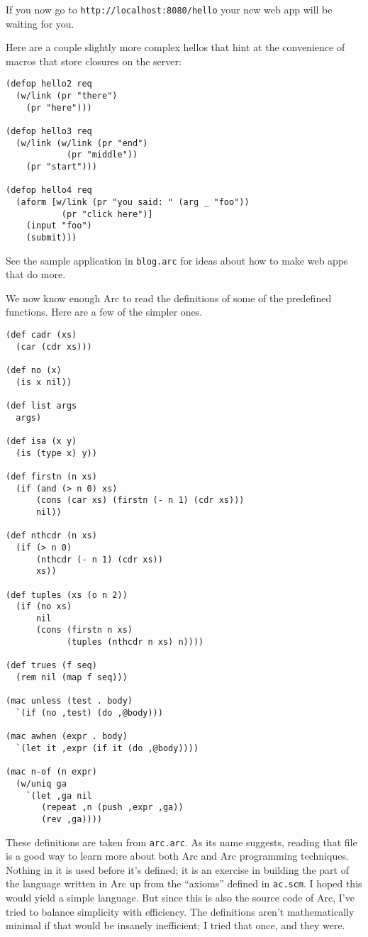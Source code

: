 \documentclass[a4paper,12pt]{book}
\begin{document}
If you now go to \verb|http://localhost:8080/hello| your new web app will
be waiting for you.

Here are a couple slightly more complex hellos that hint at the
convenience of macros that store closures on the server:

\begin{verbatim}
(defop hello2 req
  (w/link (pr "there") 
    (pr "here")))

(defop hello3 req
  (w/link (w/link (pr "end")
            (pr "middle"))
    (pr "start")))

(defop hello4 req
  (aform [w/link (pr "you said: " (arg _ "foo"))
           (pr "click here")]
    (input "foo")
    (submit)))
\end{verbatim}

See the sample application in \verb|blog.arc| for ideas about how to make
web apps that do more.

We now know enough {\sc{}Arc} to read the definitions of some of the
predefined functions.  Here are a few of the simpler ones.

\begin{verbatim}
(def cadr (xs) 
  (car (cdr xs)))

(def no (x) 
  (is x nil))

(def list args 
  args)

(def isa (x y) 
  (is (type x) y))

(def firstn (n xs)
  (if (and (> n 0) xs)
      (cons (car xs) (firstn (- n 1) (cdr xs)))
      nil))

(def nthcdr (n xs)    
  (if (> n 0)
      (nthcdr (- n 1) (cdr xs))
      xs))  

(def tuples (xs (o n 2))
  (if (no xs)
      nil
      (cons (firstn n xs)
            (tuples (nthcdr n xs) n))))

(def trues (f seq) 
  (rem nil (map f seq)))

(mac unless (test . body)
  `(if (no ,test) (do ,@body)))

(mac awhen (expr . body)
  `(let it ,expr (if it (do ,@body))))

(mac n-of (n expr)
  (w/uniq ga
    `(let ,ga nil
       (repeat ,n (push ,expr ,ga))
       (rev ,ga))))
\end{verbatim}

These definitions are taken from \verb|arc.arc|.  As its name suggests,
reading that file is a good way to learn more about both {\sc{}Arc} and
{\sc{}Arc} programming techniques.  Nothing in it is used before it's
defined; it is an exercise in building the part of the language
written in {\sc{}Arc} up from the ``axioms'' defined in \verb|ac.scm|. I hoped this
would yield a simple language.  But since this is also the source
code of {\sc{}Arc}, I've tried to balance simplicity with efficiency.  The
definitions aren't mathematically minimal if that would be insanely
inefficient; I tried that once, and they were.
\end{document}
